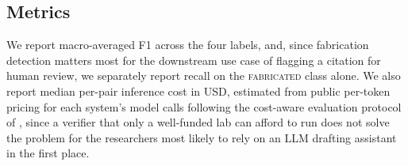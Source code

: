 \subsection{Metrics}

We report macro-averaged F1 across the four labels, and, since fabrication
detection matters most for the downstream use case of flagging a citation
for human review, we separately report recall on the \textsc{fabricated}
class alone. We also report median per-pair inference cost in USD,
estimated from public per-token pricing for each system's model calls
following the cost-aware evaluation protocol of
\citet{ahmadi2023costaware}, since a verifier that only a well-funded lab
can afford to run does not solve the problem for the researchers most
likely to rely on an LLM drafting assistant in the first place.
